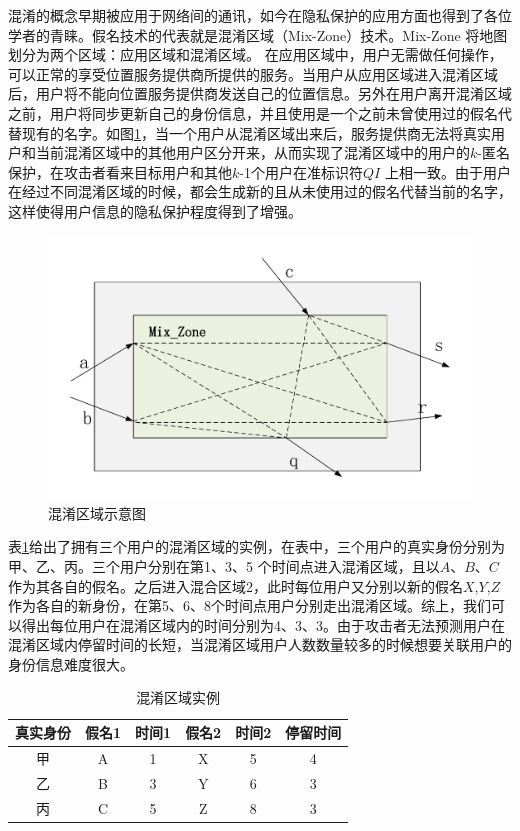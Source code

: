 混淆的概念早期被应用于网络间的通讯，如今在隐私保护的应用方面也得到了各位学者的青睐。假名技术的代表就是混淆区域（Mix-Zone）技术。Mix-Zone 将地图划分为两个区域：应用区域和混淆区域\cite{Mix}。 在应用区域中，用户无需做任何操作，可以正常的享受位置服务提供商所提供的服务。当用户从应用区域进入混淆区域后，用户将不能向位置服务提供商发送自己的位置信息。另外在用户离开混淆区域之前，用户将同步更新自己的身份信息，并且使用是一个之前未曾使用过的假名代替现有的名字。如图\ref{fig:mix_zone_pdf}，当一个用户从混淆区域出来后，服务提供商无法将真实用户和当前混淆区域中的其他用户区分开来，从而实现了混淆区域中的用户的$k$-匿名保护，在攻击者看来目标用户和其他$k$-1个用户在准标识符$QI$ 上相一致。由于用户在经过不同混淆区域的时候，都会生成新的且从未使用过的假名代替当前的名字，这样使得用户信息的隐私保护程度得到了增强。
\begin{figure}[H]
\centering
\includegraphics[width=12cm]{fig/mix_zone.pdf}
\caption{混淆区域示意图} %
\label{fig:mix_zone_pdf}
\end{figure}
表\ref{mix}给出了拥有三个用户的混淆区域的实例，在表中，三个用户的真实身份分别为甲、乙、丙。三个用户分别在第1、3、5 个时间点进入混淆区域，且以$A$、$B$、$C$ 作为其各自的假名。之后进入混合区域2，此时每位用户又分别以新的假名$X$,$Y$,$Z$ 作为各自的新身份，在第5、6、8个时间点用户分别走出混淆区域。综上，我们可以得出每位用户在混淆区域内的时间分别为4、3、3\cite{cheyanzhe}。由于攻击者无法预测用户在混淆区域内停留时间的长短，当混淆区域用户人数数量较多的时候想要关联用户的身份信息难度很大。
\begin{table}[H]
\centering  %
\begin{tabular}{cccccc}  %
\hline
真实身份 &假名1&时间1 &假名2&时间2&停留时间\\ \hline  %
甲 &A &1 &X &5 &4\\         %
乙 &B &3 &Y &6 &3\\        %
丙 &C &5 &Z &8 &3\\ \hline
\end{tabular}
\caption{混淆区域实例}\label{mix}
\end{table}

